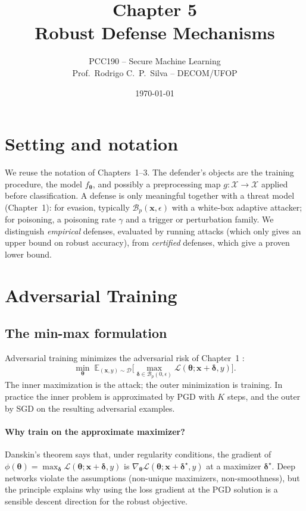 \documentclass[10pt,a4paper]{extarticle}
\title{Chapter 5\\Robust Defense Mechanisms}
\author{PCC190 -- Secure Machine Learning\\Prof.\ Rodrigo C.\ P.\ Silva -- DECOM/UFOP}
\date{\today}
\theoremstyle{definition}
\newcommand{\X}{\mathcal{X}}
\newcommand{\D}{\mathcal{D}}
\newcommand{\Loss}{\mathcal{L}}
\newcommand{\x}{\mathbf{x}}
\newcommand{\bdelta}{\boldsymbol{\delta}}
\newcommand{\btheta}{\boldsymbol{\theta}}
\newcommand{\B}{\mathcal{B}}
\begin{document}
\maketitle
\thispagestyle{fancy}
\tableofcontents

\section*{Setting and notation}

We reuse the notation of Chapters~1--3. The defender's objects are the training procedure, the model \(f_{\btheta}\), and possibly a preprocessing map \(g:\X\to\X\) applied before classification. A defense is only meaningful together with a threat model (Chapter~1): for evasion, typically \(\B_p(\x,\epsilon)\) with a white-box adaptive attacker; for poisoning, a poisoning rate \(\gamma\) and a trigger or perturbation family. We distinguish \emph{empirical} defenses, evaluated by running attacks (which only gives an upper bound on robust accuracy), from \emph{certified} defenses, which give a proven lower bound.

\section{Adversarial Training}

\subsection{The min-max formulation}

Adversarial training minimizes the adversarial risk of Chapter~1 \citep{madry2018towards}:
\begin{equation}\label{eq:minmax}
\min_{\btheta}\;\mathbb{E}_{(\x,y)\sim\D}\Big[\max_{\bdelta\in\B_p(0,\epsilon)}\Loss(\btheta;\x+\bdelta,y)\Big].
\end{equation}
The inner maximization is the attack; the outer minimization is training. In practice the inner problem is approximated by PGD with \(K\) steps, and the outer by SGD on the resulting adversarial examples.

\paragraph{Why train on the approximate maximizer?} Danskin's theorem says that, under regularity conditions, the gradient of \(\phi(\btheta)=\max_{\bdelta}\Loss(\btheta;\x+\bdelta,y)\) is \(\nabla_{\btheta}\Loss(\btheta;\x+\bdelta^\star,y)\) at a maximizer \(\bdelta^\star\). Deep networks violate the assumptions (non-unique maximizers, non-smoothness), but the principle explains why using the loss gradient at the PGD solution is a sensible descent direction for the robust objective.
\end{document}
